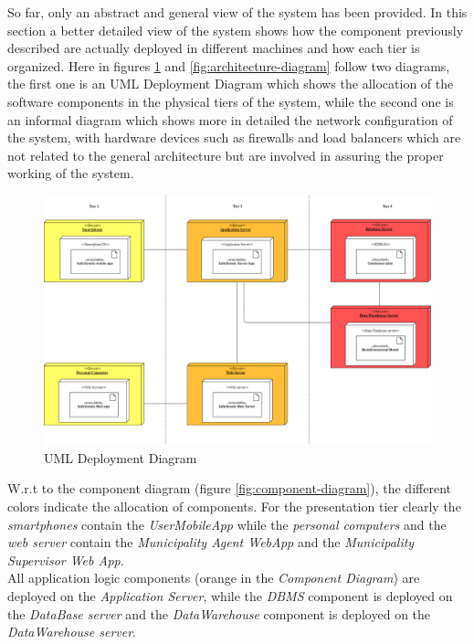 \documentclass[a4paper]{report}
\begin{document}
So far, only an abstract and general view of the system has been provided. In this section a better detailed view of the system shows how the component previously described are actually deployed in different machines and how each tier is organized.
Here in figures \ref{fig:deployment-diagram} and \ref{fig:architecture-diagram} follow two diagrams, the first one is an UML Deployment Diagram which shows the allocation of the software components in the physical tiers of the system, while the second one is an informal diagram which shows more in detailed the network configuration of the system, with hardware devices such as firewalls and load balancers which are not related to the general architecture but are involved in assuring the proper working of the system. 

\begin{figure}[htp]
\includegraphics[scale=0.3]{DeploymentDiagram}
\caption{UML Deployment Diagram}
\label{fig:deployment-diagram}
\end{figure}

W.r.t to the component diagram (figure \ref{fig:component-diagram}), the different colors indicate the allocation of components.
For the presentation tier clearly the \textit{smartphones} contain the \textit{UserMobileApp} while the \textit{personal computers} and the \textit{web server} contain the \textit{Municipality Agent WebApp} and the \textit{Municipality Supervisor Web App}.\\
All application logic components (orange in the \textit{Component Diagram}) are deployed on the \textit{Application Server}, while the \textit{DBMS} component is deployed on the \textit{DataBase server} and the \textit{DataWarehouse} component is deployed on the \textit{DataWarehouse server}.
\end{document}
